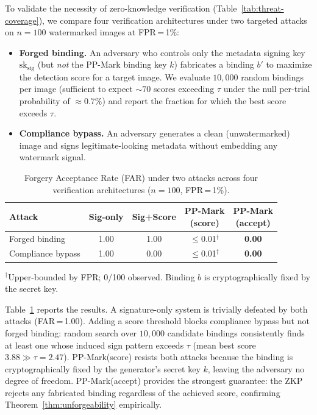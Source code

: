 \documentclass{article}
\theoremstyle{plain}
\theoremstyle{definition}
\theoremstyle{remark}
\begin{document}
To validate the necessity of zero-knowledge verification (Table~\ref{tab:threat-coverage}), we compare four verification architectures under two targeted attacks on $n=100$ watermarked images at FPR\,=\,1\%:

\begin{itemize}
\item \textbf{Forged binding.} An adversary who controls only the metadata signing key $\mathrm{sk_{sig}}$ (but \emph{not} the PP-Mark binding key $k$) fabricates a binding $b'$ to maximize the detection score for a target image. We evaluate $10{,}000$ random bindings per image (sufficient to expect ${\sim}70$ scores exceeding $\tau$ under the null per-trial probability of ${\approx}0.7\%$) and report the fraction for which the best score exceeds $\tau$.
\item \textbf{Compliance bypass.} An adversary generates a clean (unwatermarked) image and signs legitimate-looking metadata without embedding any watermark signal.
\end{itemize}

\begin{table}[t]
\centering
\caption{Forgery Acceptance Rate (FAR) under two attacks across four verification architectures ($n=100$, FPR\,=\,1\%).}
\label{tab:sig-vs-zkp}
\small
\begin{tabular}{lcccc}
\toprule
Attack & Sig-only & Sig+Score & \makecell{PP-Mark\\(score)} & \makecell{PP-Mark\\(accept)} \\
\midrule
Forged binding & 1.00 & 1.00 & ${\leq}$0.01$^{\dagger}$ & \textbf{0.00} \\
Compliance bypass & 1.00 & 0.00 & ${\leq}$0.01$^{\dagger}$ & \textbf{0.00} \\
\bottomrule
\end{tabular}
\vspace{2pt}

{\footnotesize $^{\dagger}$Upper-bounded by FPR; 0/100 observed. Binding $b$ is cryptographically fixed by the secret key.}
\end{table}

Table~\ref{tab:sig-vs-zkp} reports the results. A signature-only system is trivially defeated by both attacks (FAR\,=\,1.00). Adding a score threshold blocks compliance bypass but not forged binding: random search over $10{,}000$ candidate bindings consistently finds at least one whose induced sign pattern exceeds $\tau$ (mean best score $3.88 \gg \tau{=}2.47$). PP-Mark(score) resists both attacks because the binding is cryptographically fixed by the generator's secret key $k$, leaving the adversary no degree of freedom. PP-Mark(accept) provides the strongest guarantee: the ZKP rejects any fabricated binding regardless of the achieved score, confirming Theorem~\ref{thm:unforgeability} empirically.
\end{document}

